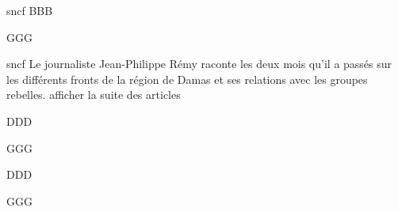 \documentclass[12pt]{book}
\begin{document}
\begin{pages}
\begin{Leftside}
\beginnumbering
\pstart
sncf
BBB
\pend

\pstart
{}

GGG
\pend
\endnumbering
\end{Leftside}

\begin{Rightside}
\beginnumbering
\pstart
sncf Le journaliste Jean-Philippe Rémy raconte les deux mois qu'il a passés sur les différents fronts de la région de Damas et ses relations avec les groupes rebelles.
afficher la suite des articles

DDD
\pend
\pstart
{}

GGG
\pend
\endnumbering
\end{Rightside}
\Pages
\end{pages}

\beginnumbering
\ledheads
{}
\eledheads
DDD
\pend
\pstart
{}

GGG
\pend
\endnumbering
\end{document}

